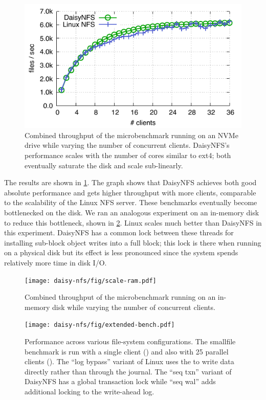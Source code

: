 \begin{figure}
  \includegraphics{daisy-nfs/fig/scale.pdf}
  \caption[Concurrent smallfile performance]%
{Combined throughput of the  microbenchmark running on
    an NVMe drive while
    varying the number of concurrent clients. DaisyNFS's performance scales with the
    number of cores similar to ext4; both eventually saturate the disk and scale
    sub-linearly.}
  \label{fig:eval:scale}
\end{figure}

The results are shown in \cref{fig:eval:scale}. The graph shows that DaisyNFS
achieves both good absolute performance and gets higher throughput with more
clients, comparable to the scalability of the Linux NFS server. These benchmarks
eventually become bottlenecked on the disk. We ran an analogous experiment on an
in-memory disk to reduce this bottleneck, shown in \cref{fig:eval:scale-ram}.
Linux scales much better than DaisyNFS in this experiment. DaisyNFS has a common
lock between these threads for installing sub-block object writes into a full
block; this lock is there when running on a physical disk but its effect is less
pronounced since the system spends relatively more time in disk I/O.

\begin{figure}
  \texttt{[image: daisy-nfs/fig/scale-ram.pdf]}
  \caption[Concurrent smallfile performance, with RAM disk]%
  {Combined throughput of the  microbenchmark running on an
    in-memory disk while varying the number of concurrent clients.}
  \label{fig:eval:scale-ram}
\end{figure}

\begin{figure}[hp]
  \texttt{[image: daisy-nfs/fig/extended-bench.pdf]}
  \caption{Performance across various file-system configurations. The smallfile
    benchmark is run with a single client () and also with 25
    parallel clients (). The ``log bypass'' variant of Linux
    uses the  to write data directly rather than through the
    journal. The ``seq txn'' variant of DaisyNFS has a global transaction lock
    while ``seq wal'' adds additional locking to the write-ahead log.}
  \label{fig:bench-configs}
\end{figure}


